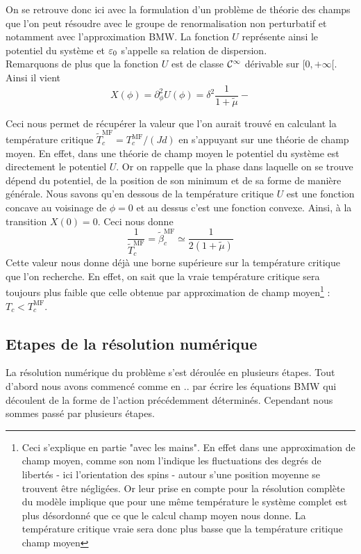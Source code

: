 \documentclass[10pt]{article}
\begin{document}
\begin{multicols}{2}
On se retrouve donc ici avec la formulation d'un problème de théorie des champs que l'on peut résoudre avec le groupe de renormalisation non perturbatif et notamment avec l'approximation BMW. La fonction $U$ représente ainsi le potentiel du système et $\varepsilon_0$ s'appelle sa relation de dispersion.\\

Remarquons de plus que la fonction $U$ est de classe $\mathcal{C}^\infty$ dérivable sur $[0,+\infty[$. Ainsi il vient 
\begin{equation}
X(\phi) = \partial_\phi^2 U(\phi) = \delta^2 \frac{1}{1+\tilde{\mu}} - 
\end{equation}

Ceci nous permet de récupérer la valeur que l'on aurait trouvé en calculant la température critique $\tilde{T}_c^{\text{MF}} = T_c^{\text{MF}}/(Jd) $ en s'appuyant sur une théorie de champ moyen. En effet, dans une théorie de champ moyen le potentiel du système est directement le potentiel $U$. Or on rappelle que la phase dans laquelle on se trouve dépend du potentiel, de la position de son minimum et de sa forme de manière générale. Nous savons qu'en dessous de la température critique $U$ est une fonction concave au voisinage de $\phi = 0$ et au dessus c'est une fonction convexe. Ainsi, à la transition $X(0) = 0$. Ceci nous donne
\begin{equation}
 \frac{1}{\tilde{T}_c^{\text{MF}}} = \tilde{\beta}_c^{\text{MF}} \simeq \frac{1}{2(1+\tilde{\mu})}
\end{equation}
Cette valeur nous donne déjà une borne supérieure sur la température critique que l'on recherche. En effet, on sait que la vraie température critique sera toujours plus faible que celle obtenue par approximation de champ moyen\footnote{Ceci s'explique en partie "avec les mains". En effet dans une approximation de champ moyen, comme son nom l'indique les fluctuations des degrés de libertés - ici l'orientation des spins - autour s'une position moyenne se trouvent être négligées. Or leur prise en compte pour la résolution complète du modèle implique que pour une même température le système complet est plus désordonné que ce que le calcul champ moyen nous donne. La température critique vraie sera donc plus basse que la température critique champ moyen} : $T_c < T_c^{\text{MF}}$.


\vspace*{11pt}

\vspace*{11pt}
\subsection{Etapes de la résolution numérique}
La résolution numérique du problème s'est déroulée en plusieurs étapes. Tout d'abord nous avons commencé comme en .. par écrire les équations BMW qui découlent de la forme de l'action précédemment déterminés. Cependant nous sommes passé par plusieurs étapes. \\


\end{multicols}
\end{document}
